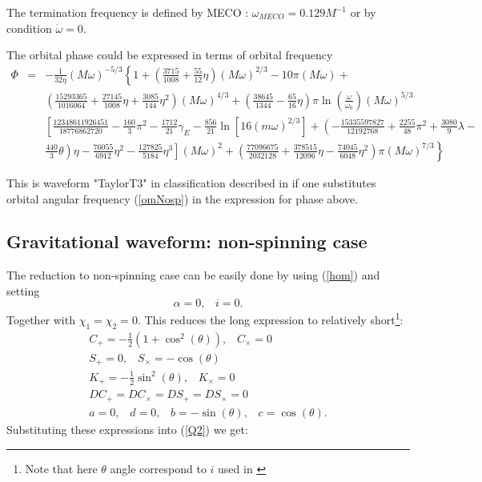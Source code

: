 \documentclass[11pt]{report}
\def\bea{\begin{eqnarray}}
\def\ena{\end{eqnarray}}
\begin{document}
The termination frequency is defined by MECO \cite{BCV2}: $\omega_{MECO} = 0.129M^{-1}$ or 
by condition $\dot{\omega}=0$.

The orbital phase could be expressed in terms of orbital frequency
\bea
\Phi &=& -\frac1{32\eta}(M\omega)^{-5/3}\left\{ 1 + \left( \frac{3715}{1008} + \frac{55}{12}\eta\right)
(M\omega)^{2/3} - 10\pi(M\omega) + \right. \nonumber \\
& & \left. \left( \frac{15293365}{1016064} + \frac{27145}{1008}\eta + \frac{3085}{144}\eta^2\right)
(M\omega)^{4/3} + \left( \frac{38645}{1344} - \frac{65}{16}\eta \right)\pi\ln\left( \frac{\omega}{\omega_0}\right) (M\omega)^{5/3} \right. \nonumber \\
& &  \left. \left[ \frac{12348611926451}{18776862720} -\frac{160}{3}\pi^2 - \frac{1712}{21}\gamma_E
- \frac{856}{21}\ln\left[ 16(m\omega)^{2/3}\right] + \left( -\frac{15335597827}{12192768} +
\frac{2255}{48}\pi^2 + \frac{3080}{9}\lambda - \right.\right.\right. \nonumber \\
& & \left.\left.\left.  \frac{440}{3}\theta\right)\eta - \frac{76055}{6912}\eta^2 - 
\frac{127825}{5184}\eta^3\right](M\omega)^{2} + \left( \frac{77096675}{2032128} + 
\frac{378515}{12096}\eta - \frac{74045}{6048}\eta^2\right)\pi(M\omega)^{7/3} 
\right\}
\ena

This is waveform "TaylorT3" in classification described in \cite{DIS} if one substitutes 
orbital angular frequency (\ref{omNosp}) in the expression for phase above.

\subsection{Gravitational waveform: non-spinning case}

The reduction to non-spinning case can be easily done by using (\ref{hom})
and setting 
$$
\alpha =0,\;\;\; i = 0.
$$
Together with $\chi_1=\chi_2=0$.
This reduces the long expression to relatively short\footnote{Note that here $\theta$ angle correspond
to $i$ used in \cite{FC}}:
\bea
C_{+} = -\frac1{2}(1+ \cos^2(\theta)), \;\;\; C_{\times} = 0\\
S_{+} = 0,\;\;\; S_{\times} = -\cos(\theta)\\
K_{+} = -\frac1{2}\sin^2(\theta),\;\;\; K_{\times} = 0\\
DC_{+}=DC_{\times}=DS_{+}=DS_{\times} = 0\\
a=0,\;\;\; d=0,\;\;\; b=-\sin(\theta),\;\;\; c=\cos(\theta). 
\ena
Substituting these expressions into (\ref{Q2}) we get:
\end{document}
